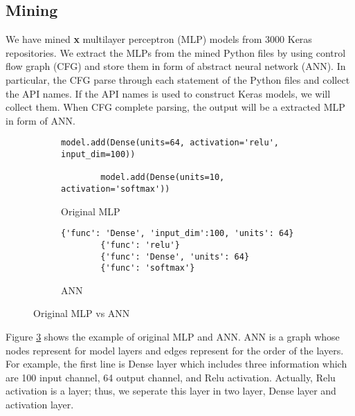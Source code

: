 \subsection{Mining}

We have mined {\bf x} multilayer perceptron (MLP) models from 3000 Keras repositories. We extract the MLPs from the mined Python files by using control flow graph (CFG) and store them in form of abstract neural network (ANN). In particular, the CFG parse through each statement of the Python files and collect the API names. If the API names is used to construct Keras models, we will collect them. When CFG complete parsing, the output will be a extracted MLP in form of ANN.
\begin{figure}[H]
	\centering
	\begin{subfigure}[b]{.45\linewidth}
		\begin{lstlisting}[basicstyle=\tiny,numberblanklines=false]
		model.add(Dense(units=64, activation='relu', input_dim=100)) 
		
		model.add(Dense(units=10, activation='softmax'))
		\end{lstlisting}
		\caption{Original MLP}
		\label{fig:originalCNN}
	\end{subfigure}
	\begin{subfigure}[b]{.45\linewidth}
		\begin{lstlisting}[basicstyle=\tiny,numberblanklines=false]	
		{'func': 'Dense', 'input_dim':100, 'units': 64} 
		{'func': 'relu'}
		{'func': 'Dense', 'units': 64}
		{'func': 'softmax'}
		\end{lstlisting}
		\caption{ANN}
		\label{fig:convertedCNN}
	\end{subfigure}
	\caption{Original MLP vs ANN}
	\label{fig:converted}
\end{figure}
Figure \ref{fig:converted} shows the example of original MLP and ANN. ANN is a graph whose nodes represent for model layers and edges represent for the order of the layers. For example, the first line is Dense layer which includes three information which are 100 input channel, 64 output channel, and Relu activation. Actually, Relu activation is a layer; thus, we seperate this layer in two layer, Dense layer and activation layer.
  